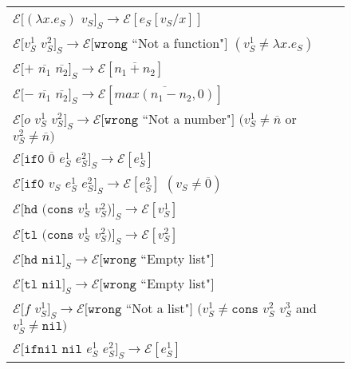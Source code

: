 \begin{figure}[p]
\centering
\begin{tabular}{l}
$\mathscr{E}[(\lambda x.e_{S})$ $v_{S}]_{S}\rightarrow\mathscr{E}[e_{S}[v_{S}/x]]$ \\

$\mathscr{E}[v_{S}^{1}$ $v_{S}^{2}]_{S}\rightarrow\mathscr{E}[\mathtt{wrong}$ ``Not a function"$]$ $(v_{S}^{1}\neq\lambda x.e_{S})$ \\

$\mathscr{E}[+$ $\overline{n_{1}}$ $\overline{n_{2}}]_{S}\rightarrow\mathscr{E}[\overline{n_{1}+n_{2}}]$ \\

$\mathscr{E}[-$ $\overline{n_{1}}$ $\overline{n_{2}}]_{S}\rightarrow\mathscr{E}[\overline{max(n_{1}-n_{2},0)}]$ \\

$\mathscr{E}[o$ $v_{S}^{1}$ $v_{S}^{2}]_{S}\rightarrow\mathscr{E}[\mathtt{wrong}$ ``Not a number"$]$ $(v_{S}^{1}\neq\overline{n}$ or $v_{S}^{2}\neq\overline{n})$ \\

$\mathscr{E}[\mathtt{if0}$ $\overline{0}$ $e_{S}^{1}$ $e_{S}^{2}]_{S}\rightarrow\mathscr{E}[e_{S}^{1}]$ \\

$\mathscr{E}[\mathtt{if0}$ $v_{S}$ $e_{S}^{1}$ $e_{S}^{2}]_{S}\rightarrow\mathscr{E}[e_{S}^{2}]$ $(v_{S}\neq\overline{0})$ \\

$\mathscr{E}[\mathtt{hd}$ $(\mathtt{cons}$ $v_{S}^{1}$ $v_{S}^{2})]_{S}\rightarrow\mathscr{E}[v_{S}^{1}]$ \\

$\mathscr{E}[\mathtt{tl}$ $(\mathtt{cons}$ $v_{S}^{1}$ $v_{S}^{2})]_{S}\rightarrow\mathscr{E}[v_{S}^{2}]$ \\

$\mathscr{E}[\mathtt{hd}$ $\mathtt{nil}]_{S}\rightarrow\mathscr{E}[\mathtt{wrong}$ ``Empty list"$]$ \\

$\mathscr{E}[\mathtt{tl}$ $\mathtt{nil}]_{S}\rightarrow\mathscr{E}[\mathtt{wrong}$ ``Empty list"$]$ \\

$\mathscr{E}[f$ $v_{S}^{1}]_{S}\rightarrow\mathscr{E}[\mathtt{wrong}$ ``Not a list"$]$ $(v_{S}^{1}\neq\mathtt{cons}$ $v_{S}^{2}$ $v_{S}^{3}$ and $v_{S}^{1}\neq\mathtt{nil})$ \\

$\mathscr{E}[\mathtt{ifnil}$ $\mathtt{nil}$ $e_{S}^{1}$ $e_{S}^{2}]_{S}\rightarrow\mathscr{E}[e_{S}^{1}]$ \\


\end{tabular}
\end{figure}
